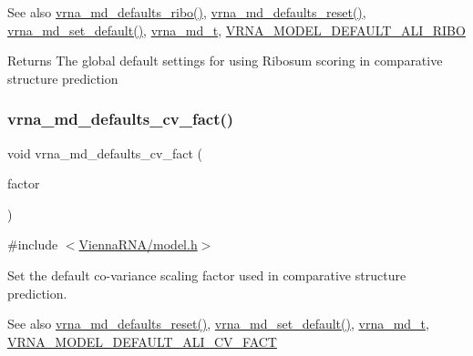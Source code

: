 \begin{DoxySeeAlso}{See also}
\mbox{\hyperlink{group__model__details_ga937c45e1d06fd6168730a9b08d130be3}{vrna\+\_\+md\+\_\+defaults\+\_\+ribo()}}, \mbox{\hyperlink{group__model__details_ga70834424cf804d149937de89f80ceb45}{vrna\+\_\+md\+\_\+defaults\+\_\+reset()}}, \mbox{\hyperlink{group__model__details_ga8ac6ff84936282436f822644bf841f66}{vrna\+\_\+md\+\_\+set\+\_\+default()}}, \mbox{\hyperlink{group__model__details_ga1f8a10e12a0a1915f2a4eff0b28ea17c}{vrna\+\_\+md\+\_\+t}}, \mbox{\hyperlink{group__model__details_ga64b3ab65a9ca42d4ad1d05e193083147}{V\+R\+N\+A\+\_\+\+M\+O\+D\+E\+L\+\_\+\+D\+E\+F\+A\+U\+L\+T\+\_\+\+A\+L\+I\+\_\+\+R\+I\+BO}} 
\end{DoxySeeAlso}
\begin{DoxyReturn}{Returns}
The global default settings for using Ribosum scoring in comparative structure prediction 
\end{DoxyReturn}
\mbox{\label{group__model__details_gad3a3f40baafd91a6ce80a91a68e20053}} 
\subsubsection{\texorpdfstring{vrna\+\_\+md\+\_\+defaults\+\_\+cv\+\_\+fact()}{vrna\_md\_defaults\_cv\_fact()}}
{\footnotesize\ttfamily void vrna\+\_\+md\+\_\+defaults\+\_\+cv\+\_\+fact (\begin{DoxyParamCaption}\item[{double}]{factor }\end{DoxyParamCaption})}



{\ttfamily \#include $<$\mbox{\hyperlink{model_8h}{Vienna\+R\+N\+A/model.\+h}}$>$}



Set the default co-\/variance scaling factor used in comparative structure prediction. 

\begin{DoxySeeAlso}{See also}
\mbox{\hyperlink{group__model__details_ga70834424cf804d149937de89f80ceb45}{vrna\+\_\+md\+\_\+defaults\+\_\+reset()}}, \mbox{\hyperlink{group__model__details_ga8ac6ff84936282436f822644bf841f66}{vrna\+\_\+md\+\_\+set\+\_\+default()}}, \mbox{\hyperlink{group__model__details_ga1f8a10e12a0a1915f2a4eff0b28ea17c}{vrna\+\_\+md\+\_\+t}}, \mbox{\hyperlink{group__model__details_gaaaf3d73d6abc18d3889676952bfedb96}{V\+R\+N\+A\+\_\+\+M\+O\+D\+E\+L\+\_\+\+D\+E\+F\+A\+U\+L\+T\+\_\+\+A\+L\+I\+\_\+\+C\+V\+\_\+\+F\+A\+CT}} 
\end{DoxySeeAlso}

